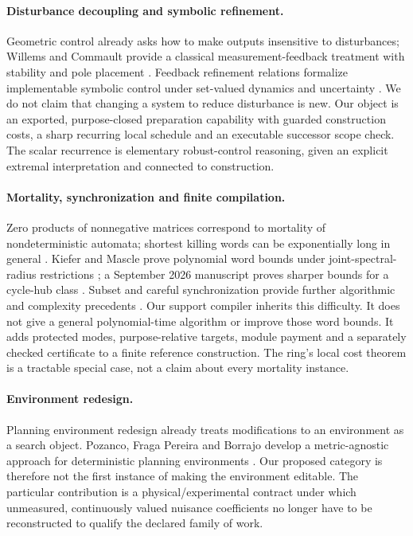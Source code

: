 \documentclass[11pt,letterpaper]{article}
\theoremstyle{definition}\newtheorem{definition}[theorem]{Definition}
\theoremstyle{remark}\newtheorem{remark}[theorem]{Remark}
\begin{document}
\paragraph{Disturbance decoupling and symbolic refinement.}
Geometric control already asks how to make outputs insensitive to disturbances; Willems and Commault provide a classical measurement-feedback treatment with stability and pole placement \cite{willems}. Feedback refinement relations formalize implementable symbolic control under set-valued dynamics and uncertainty \cite{reissig}. We do not claim that changing a system to reduce disturbance is new. Our object is an exported, purpose-closed preparation capability with guarded construction costs, a sharp recurring local schedule and an executable successor scope check. The scalar recurrence is elementary robust-control reasoning, given an explicit extremal interpretation and connected to construction.

\paragraph{Mortality, synchronization and finite compilation.}
Zero products of nonnegative matrices correspond to mortality of nondeterministic automata; shortest killing words can be exponentially long in general \cite{ryzhikov}. Kiefer and Mascle prove polynomial word bounds under joint-spectral-radius restrictions \cite{kiefer}; a September 2026 manuscript proves sharper bounds for a cycle-hub class \cite{chandelkar}. Subset and careful synchronization provide further algorithmic and complexity precedents \cite{vorel}. Our support compiler inherits this difficulty. It does not give a general polynomial-time algorithm or improve those word bounds. It adds protected modes, purpose-relative targets, module payment and a separately checked certificate to a finite reference construction. The ring's local cost theorem is a tractable special case, not a claim about every mortality instance.

\paragraph{Environment redesign.}
Planning environment redesign already treats modifications to an environment as a search object. Pozanco, Fraga Pereira and Borrajo develop a metric-agnostic approach for deterministic planning environments \cite{environment}. Our proposed category is therefore not the first instance of making the environment editable. The particular contribution is a physical/experimental contract under which unmeasured, continuously valued nuisance coefficients no longer have to be reconstructed to qualify the declared family of work.
\end{document}
